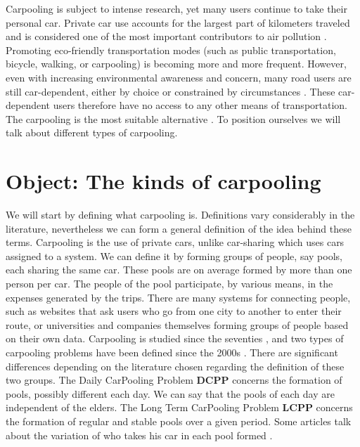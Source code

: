 \documentclass[12pt, a4paper,twoside]{memoir}
\newcommand{\newpar}{\vskip 0.2in \noindent}
\newcommand\tab[1][1cm]{\hspace*{#1}}
\begin{document}
	Carpooling is subject to intense research, yet many users continue to take their personal car. Private car use accounts for the largest part of kilometers traveled and is considered one of the most important contributors to air pollution \cite{laucontributions2008}. Promoting eco-friendly transportation modes (such as public transportation, bicycle, walking, or carpooling) is becoming more and more frequent. However, even with increasing environmental awareness and concern, many road users are still car-dependent, either by choice or constrained by circumstances \cite{stradeterminants2007}. These car-dependent users therefore have no access to any other means of transportation. The carpooling is the most suitable alternative \cite{delhommecomparing2016}.
	\newpar 
	To position ourselves we will talk about different types of carpooling.
	
	\section{Object: The kinds of carpooling }\label{sec:The kinds of carpooling}
	We will start by defining what carpooling is. Definitions vary considerably in the literature, nevertheless we can form a general definition of the idea behind these terms. Carpooling is the use of private cars, unlike car-sharing which uses cars assigned to a system. We can define it by forming groups of people, say pools, each sharing the same car. These pools are on average formed by more than one person per car. The people of the pool participate, by various means, in the expenses generated by the trips.\newline
	There are many systems for connecting people, such as websites that ask users who go from one city to another to enter their route, or universities and companies themselves forming groups of people based on their own data.
	\newpar
	Carpooling is studied since the seventies \cite{wohlmethodology1970} \cite{sagnerimpact1974}, and two types of carpooling problems have been defined since the 2000s \cite{kotharigenghis-multiagent2004} \cite{maniezzoants2004} \cite{calvodistributed2004}. There are significant differences depending on the literature chosen regarding the definition of these two groups.\newline
		\tab The Daily CarPooling Problem \textbf{DCPP} concerns the formation of pools, possibly different each day. We can say that the pools of each day are independent of the elders.\newline
		\tab The Long Term CarPooling Problem \textbf{LCPP} concerns the formation of regular and stable pools over a given period. Some articles talk about the variation of who takes his car in each pool formed \cite{guometaheuristics2012}. 
	
\end{document}
